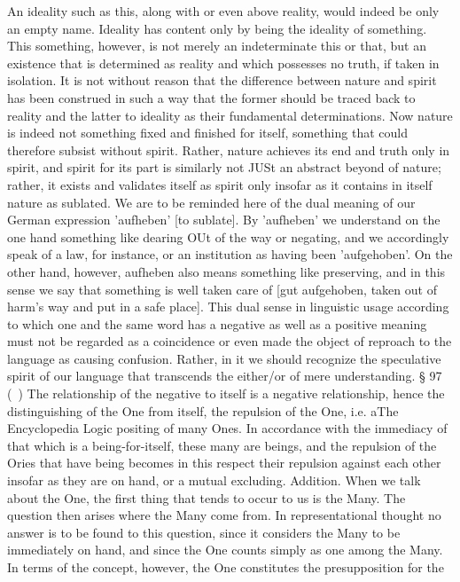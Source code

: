 An ideality such as this, along with or even above reality, would indeed be only an
empty name. Ideality has content only by being the ideality of something. This
something, however, is not merely an indeterminate this or that, but an existence
that is determined as reality and which possesses no truth, if taken in isolation.
It is not without reason that the difference between nature and spirit has been
construed in such a way that the former should be traced back to reality and
the latter to ideality as their fundamental determinations. Now nature is indeed
not something fixed and finished for itself, something that could therefore subsist
without spirit. Rather, nature achieves its end and truth only in spirit, and spirit
for its part is similarly not JUSt an abstract beyond of nature; rather, it exists and
validates itself as spirit only insofar as it contains in itself nature as sublated. We
are to be reminded here of the dual meaning of our German expression 'aufheben'
[to sublate]. By 'aufheben' we understand on the one hand something like dearing
OUt of the way or negating, and we accordingly speak of a law, for instance, or
an institution as having been 'aufgehoben'. On the other hand, however, aufheben
also means something like preserving, and in this sense we say that something is
well taken care of [gut aufgehoben, taken out of harm's way and put in a safe place].
This dual sense in linguistic usage according to which one and the same word has
a negative as well as a positive meaning must not be regarded as a coincidence or
even made the object of reproach to the language as causing confusion. Rather, in
it we should recognize the speculative spirit of our language that transcends the
either/or of mere understanding.
§ 97
(~) The relationship of the negative to itself is a negative relationship, hence
the distinguishing of the One from itself, the repulsion of the One, i.e. aThe Encyclopedia Logic
positing of many Ones. In accordance with the immediacy of that which
is a being-for-itself, these many are beings, and the repulsion of the Ories
that have being becomes in this respect their repulsion against each other
insofar as they are on hand, or a mutual excluding.
Addition. When we talk about the One, the first thing that tends to occur to us is
the Many. The question then arises where the Many come from. In representational
thought no answer is to be found to this question, since it considers the Many to be
immediately on hand, and since the One counts simply as one among the Many.
In terms of the concept, however, the One constitutes the presupposition for the

